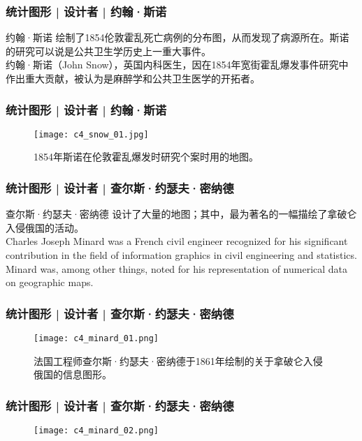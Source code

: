 \begin{frame}
  \frametitle{统计图形 | 设计者 | 约翰·斯诺}
  \begin{block}{约翰·斯诺}
    绘制了1854伦敦霍乱死亡病例的分布图，从而发现了病源所在。斯诺的研究可以说是公共卫生学历史上一重大事件。\\
    \vspace{0.5em}
    约翰·斯诺（John Snow），英国内科医生，因在1854年宽街霍乱爆发事件研究中作出重大贡献，被认为是麻醉学和公共卫生医学的开拓者。\\
  \end{block}
\end{frame}

\begin{frame}
  \frametitle{统计图形 | 设计者 | 约翰·斯诺}
  \begin{figure}
    \centering
    \texttt{[image: c4\_snow\_01.jpg]}
    \caption{1854年斯诺在伦敦霍乱爆发时研究个案时用的地图。}
  \end{figure}
\end{frame}

\begin{frame}
  \frametitle{统计图形 | 设计者 | 查尔斯·约瑟夫·密纳德}
  \begin{block}{查尔斯·约瑟夫·密纳德}
  设计了大量的地图；其中，最为著名的一幅描绘了拿破仑入侵俄国的活动。\\
  \vspace{0.5em}
  Charles Joseph Minard was a French civil engineer recognized for his significant contribution in the field of information graphics in civil engineering and statistics. Minard was, among other things, noted for his representation of numerical data on geographic maps.
  \end{block}
\end{frame}

\begin{frame}
  \frametitle{统计图形 | 设计者 | 查尔斯·约瑟夫·密纳德}
  \begin{figure}
    \centering
    \texttt{[image: c4\_minard\_01.png]}
    \caption{法国工程师查尔斯·约瑟夫·密纳德于1861年绘制的关于拿破仑入侵俄国的信息图形。}
  \end{figure}
\end{frame}

\begin{frame}
  \frametitle{统计图形 | 设计者 | 查尔斯·约瑟夫·密纳德}
  \begin{figure}
    \centering
    \texttt{[image: c4\_minard\_02.png]}
  \end{figure}
\end{frame}


